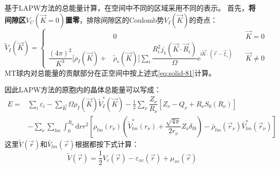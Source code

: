 基于\textrm{LAPW}方法的总能量计算，在空间中不同的区域采用不同的表示。%
首先，\textbf{将间隙区$V_C(\vec K=0)$置零}，排除间隙区的\textrm{Coulomb}势$V_I(\vec K)$的奇点：
\begin{equation}
	\tilde V_I(\vec K)=\left\{
	\begin{aligned}
		&0 \qquad &\vec K=0 \\
		\dfrac{(4\pi)^2}{K^3}\big[\rho_I(\vec K)+&\tilde\rho_s(\vec K)\big]\sum_i\dfrac{R_i^2j_1(\vec K\cdot\vec R_i)}{\Omega}\mathrm{e}^{\mathrm{i}\vec K\cdot(\vec r-\vec\xi_i)}\quad &\vec K\neq0
	\end{aligned}\right.
	\label{eq_Vcou_KI_theta_2}
\end{equation}
\textrm{MT}球内对总能量的贡献部分在正空间中按上述式\eqref{eq:solid-81}计算。

因此\textrm{LAPW}方法的原胞内的晶体总能量可以写成：
\begin{equation}
  \begin{split}
	  E=&\sum_i\varepsilon_i-\sum_{\vec K}\Omega\rho_I(\vec K)\tilde V_I^{\ast}(\vec K)-\frac12\sum_{\nu}\dfrac{Z_{\nu}}{R_{\nu}}[Z_{\nu}-Q_{\nu}+R_{\nu}S_0(R_{\nu})]\\
    &-\sum_{\nu}\sum_{lm}\int_0^{R_{\nu}}\mathrm{d}rr^2\left[\rho_{lm}(r_{\nu})\left(\tilde V_{lm}^{\ast}(r_{\nu})+\dfrac{\sqrt{4\pi}}{2r_{\nu}}Z_{\nu}\delta_{l0}\right)-\bar\rho_{lm}(\vec r_{\nu})\bar V_{lm}^{\ast}(\vec r_{\nu})\right]
  \end{split}
  \label{eq:solid-83}
\end{equation}
这里$\tilde V(\vec r)$和$\bar V_{lm}(\vec r)$根据都按下式计算：
$$\tilde V(\vec r)=\frac12V_c(\vec r)-\varepsilon_{xc}(\vec r)+\mu_{xc}(\vec r)$$

